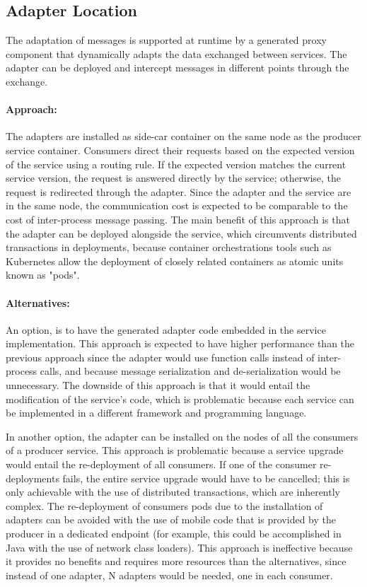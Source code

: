 \subsection{Adapter Location} %
\label{sec:adapter_location}

The adaptation of messages is supported at runtime by a generated proxy component
that dynamically adapts the data exchanged between services.
The adapter can be deployed and intercept messages in different points through the exchange.

\paragraph{Approach:}
The adapters are installed as side-car container on the same node as the producer service container.
Consumers direct their requests based on the expected version of the service using a routing rule.
If the expected version matches the current service version, the request is answered directly by the service;
otherwise, the request is redirected through the adapter.
Since the adapter and the service are in the same node, the communication cost is expected to be comparable to the cost of inter-process message passing.
The main benefit of this approach is that the adapter can be deployed alongside the service,
which circumvents distributed transactions in deployments,
because container orchestrations tools such as Kubernetes allow the deployment of closely related containers as atomic units known as "pods".

\paragraph{Alternatives:}
An option, is to have the generated adapter code embedded in the service implementation.
This approach is expected to have higher performance than the previous approach since
the adapter would use function calls instead of inter-process calls, and because message serialization and de-serialization would be unnecessary.
The downside of this approach is that it would entail the modification of the service's code, which is problematic because each service can be implemented in a different framework and programming language.

In another option, the adapter can be installed on the nodes of all the consumers of a producer service.
This approach is problematic because a service upgrade would entail the re-deployment of all consumers.
If one of the consumer re-deployments fails, the entire service upgrade would have to be cancelled;
this is only achievable with the use of distributed transactions, which are inherently complex.
The re-deployment of consumers pods due to the installation of adapters can be avoided with the use of mobile code that is provided by the producer in a dedicated endpoint
(for example, this could be accomplished in Java with the use of network class loaders).
This approach is ineffective because it provides no benefits and requires more resources than the alternatives, since
instead of one adapter, N adapters would be needed, one in each consumer.

